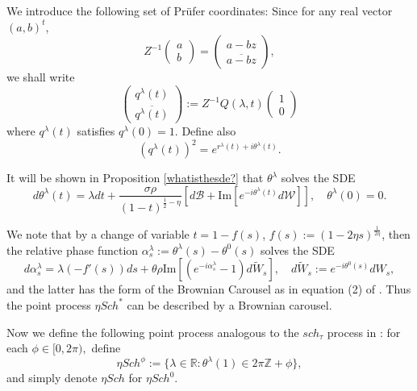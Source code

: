 \documentclass[12pt, reqno]{amsart}
\theoremstyle{definition}
\theoremstyle{remark}
\numberwithin{equation}{section}
\begin{document}
We introduce the following set of Prüfer coordinates: Since for any real vector $(a,b)^t$,
$$Z^{-1}\begin{pmatrix} a\\ b\end{pmatrix}=\begin{pmatrix} a-bz\\ \overline{a-bz}\end{pmatrix},$$
we shall write
\begin{equation}\label{nicestory}
    \begin{pmatrix}
q^\lambda(t)\\\overline{q^\lambda(t)}\end{pmatrix}:=Z^{-1}Q(\lambda,t)\begin{pmatrix}1\\0
    \end{pmatrix}
\end{equation}
where $q^\lambda(t)$ satisfies $q^\lambda(0)=1$. Define also 
\begin{equation}\label{rlambdathetalambda}(q^\lambda(t))^2=e^{r^\lambda(t)+i\theta^\lambda(t)}.\end{equation}


It will be shown in Proposition \ref{whatisthesde?} that $\theta^\lambda$ solves the SDE
\begin{equation}\label{dphilambdat}
    d\theta^\lambda(t)=\lambda dt+\frac{\sigma\rho}{(1-t)^{\frac{1}{2}-\eta}}[d\mathcal{B}+\text{Im}[e^{-i\theta^\lambda(t)}d\mathcal{W}]],\quad \theta^\lambda(0)=0.
\end{equation}

We note that by a change of variable $t=1-f(s)$, $f(s):=(1-2\eta s)^\frac{1}{2\eta}$, then the relative phase function $\alpha_s^\lambda:=\theta^\lambda(s)-\theta^0(s)$ solves the SDE
$$
d\alpha_s^\lambda=\lambda(-f'(s))ds+\theta\rho\text{Im}[(e^{-i\alpha_s^\lambda}-1)d\widetilde{W}_s],\quad d\widetilde{W}_s:=e^{-i\theta^0(s)}dW_s,
$$ and the latter has the form of the Brownian Carousel as in equation (2) of \cite{valko2009continuum}. Thus the point process $\eta Sch^*$ can be described by a Brownian carousel.
 

 Now we define the following point process analogous to the $sch_\tau$ process in \cite{kritchevski2011scaling}: for each $\phi\in[0,2\pi),$ define
\begin{equation}\label{etaschphi}
    \eta Sch^\phi:=\{\lambda\in\mathbb{R}:\theta^\lambda(1)\in 2\pi\mathbb{Z}+\phi\}, 
\end{equation}
and simply denote $\eta Sch$ for $\eta Sch^0$.
\end{document}
